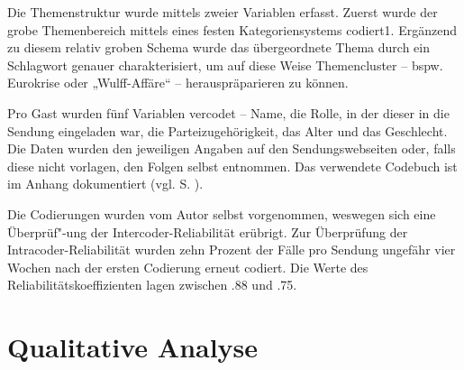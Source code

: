\begin{table}[htb]
\caption{Korpus im quantitativen Teil}
\centering
{}
\label{tab:quandaten}
\end{table}

Die Themenstruktur wurde mittels zweier Variablen erfasst. Zuerst wurde der grobe Themenbereich mittels eines festen Kategoriensystems codiert1. Ergänzend zu diesem relativ groben Schema wurde das übergeordnete Thema durch ein Schlagwort genauer charakterisiert, um auf diese Weise Themencluster – bspw. Eurokrise oder „Wulff-Affäre“ – herauspräparieren zu können.

Pro Gast wurden fünf Variablen vercodet – Name, die Rolle, in der dieser in die Sendung eingeladen war, die Parteizugehörigkeit, das Alter und das Geschlecht. Die Daten wurden den jeweiligen Angaben auf den Sendungswebseiten oder, falls diese nicht vorlagen, den Folgen selbst entnommen. Das verwendete Codebuch ist im Anhang dokumentiert (vgl. S. \pageref{anhang:codebuch}).

Die Codierungen wurden vom Autor selbst vorgenommen, weswegen sich eine Überprüf"-ung der Intercoder-Reliabilität erübrigt. Zur Überprüfung der Intracoder-Reliabilität \parencite[183-193]{roesslerInhaltsanalyse2005} wurden zehn Prozent der Fälle pro Sendung ungefähr vier Wochen nach der ersten Codierung erneut codiert. Die Werte des Reliabilitätskoeffizienten lagen zwischen .88 und .75.

\section{Qualitative Analyse}\label{chap:qualitativeanalyse}

